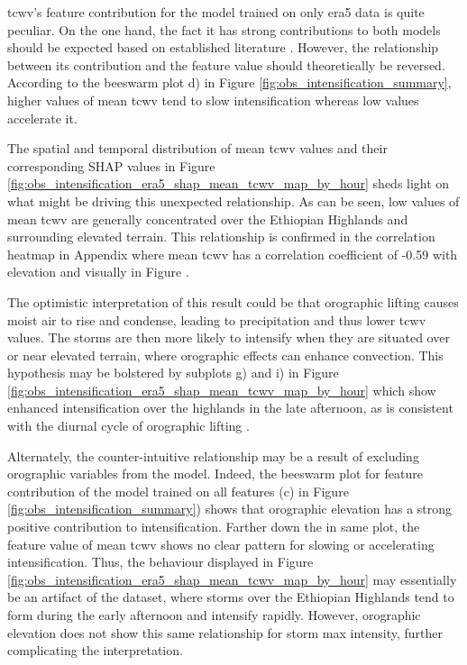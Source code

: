 \acrfull{tcwv}'s feature contribution for the model trained on only \acrshort{era5} data is quite peculiar. On the one hand, the fact it has strong contributions to both models should be expected based on established literature \citep{Li2023,Muetzelfeldt2025,Klein2020}. However, the relationship between its contribution and the feature value should theoretically be reversed. According to the beeswarm plot d) in Figure \ref{fig:obs_intensification_summary}, higher values of mean \acrshort{tcwv} tend to slow intensification whereas low values accelerate it.

The spatial and temporal distribution of mean \acrshort{tcwv} values and their corresponding SHAP values in Figure \ref{fig:obs_intensification_era5_shap_mean_tcwv_map_by_hour} sheds light on what might be driving this unexpected relationship. As can be seen, low values of mean \acrshort{tcwv} are generally concentrated over the Ethiopian Highlands and surrounding elevated terrain. This relationship is confirmed in the correlation heatmap in Appendix  where mean \acrshort{tcwv} has a correlation coefficient of -0.59 with elevation and visually in Figure .

The optimistic interpretation of this result could be that orographic lifting causes moist air to rise and condense, leading to precipitation and thus lower \acrshort{tcwv} values. The storms are then more likely to intensify when they are situated over or near elevated terrain, where orographic effects can enhance convection. This hypothesis may be bolstered by subplots g) and i) in Figure \ref{fig:obs_intensification_era5_shap_mean_tcwv_map_by_hour} which show enhanced intensification over the highlands in the late afternoon, as is consistent with the diurnal cycle of orographic lifting \citep{Colle2015,Negash2024,Zardi2013}.

Alternately, the counter-intuitive relationship may be a result of excluding orographic variables from the model. Indeed, the beeswarm plot for feature contribution of the model trained on all features (c) in Figure \ref{fig:obs_intensification_summary}) shows that orographic elevation has a strong positive contribution to intensification. Farther down the in same plot, the feature value of mean \acrshort{tcwv} shows no clear pattern for slowing or accelerating intensification. Thus, the behaviour displayed in Figure \ref{fig:obs_intensification_era5_shap_mean_tcwv_map_by_hour} may essentially be an artifact of the dataset, where storms over the Ethiopian Highlands tend to form during the early afternoon and intensify rapidly. However, orographic elevation does not show this same relationship for storm max intensity, further complicating the interpretation.

